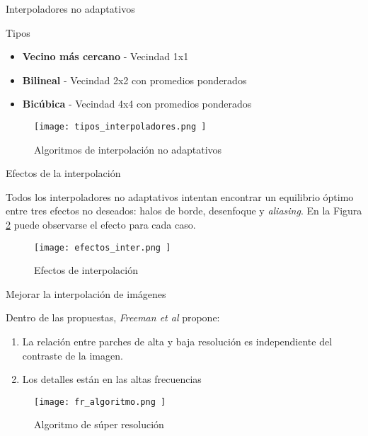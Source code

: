 \begin{frame}{Interpoladores no adaptativos}
    
    \begin{block}{Tipos}
        \begin{itemize}
            \item \textbf{Vecino más cercano} - Vecindad 1x1
            \item \textbf{Bilineal} - Vecindad 2x2 con promedios ponderados
            \item \textbf{Bicúbica} - Vecindad 4x4 con promedios ponderados 
        \end{itemize}
    \end{block}


    
    \begin{figure}[H]
        \texttt{[image:  tipos\_interpoladores.png ]}
        \centering
        \caption{ Algoritmos de interpolación no adaptativos }
        \label{fig:interpoladores}
    \end{figure}

\end{frame}

\begin{frame}{Efectos de la interpolación}
    
    Todos los interpoladores no adaptativos intentan encontrar un equilibrio óptimo
    entre tres efectos no deseados: halos de borde, desenfoque y \emph{aliasing}. En la 
    Figura \ref{fig:efectos_inter} puede observarse el efecto para cada caso. 
    
    \begin{figure}[H]
        \texttt{[image:  efectos\_inter.png ]}
        \centering
        \caption{ Efectos de interpolación}
        \label{fig:efectos_inter}
    \end{figure}

\end{frame}


\begin{frame}{Mejorar la interpolación de imágenes}
    
    \begin{block}{Dentro de las propuestas, \emph{Freeman et al} propone:}
        \begin{enumerate}
            \item La relación entre parches de alta y baja resolución
            es independiente del contraste de la imagen. 
            \item Los detalles están en las altas frecuencias 
        \end{enumerate}
    \end{block}

    \begin{figure}[H]
        \texttt{[image:  fr\_algoritmo.png ]}
        \centering
        \caption{ Algoritmo de súper resolución }
        \label{fig:fr_algoritmo}
    \end{figure}
    
\end{frame}

